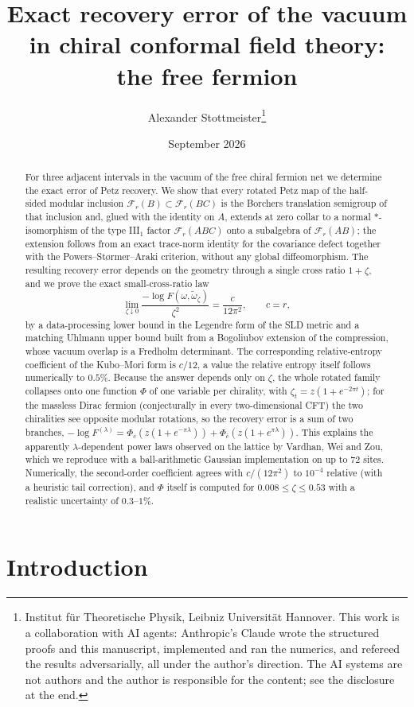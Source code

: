\documentclass[11pt,a4paper]{article}
\title{Exact recovery error of the vacuum in chiral conformal field theory:\\ the free fermion}
\author{Alexander Stottmeister\thanks{Institut f\"ur Theoretische Physik, Leibniz Universit\"at Hannover. This work is a collaboration with AI agents: Anthropic's Claude wrote the structured proofs and this manuscript, implemented and ran the numerics, and refereed the results adversarially, all under the author's direction. The AI systems are not authors and the author is responsible for the content; see the disclosure at the end.}}
\date{September 2026}
\theoremstyle{definition}\newtheorem{definition}[theorem]{Definition}\newtheorem{remark}[theorem]{Remark}
\newcommand{\cF}{\mathcal F}\newcommand{\cM}{\mathcal M}\newcommand{\Fid}{F}\newcommand{\Tr}{\operatorname{Tr}}\newcommand{\eps}{\varepsilon}
\begin{document}
\maketitle
\begin{abstract}
For three adjacent intervals in the vacuum of the free chiral fermion net we
determine the exact error of Petz recovery.  We show that every rotated Petz map
of the half-sided modular inclusion $\cF_r(B)\subset\cF_r(BC)$ is the Borchers
translation semigroup of that inclusion and, glued with the identity on $A$,
extends at zero collar to a normal $*$-isomorphism of the type III$_1$ factor
$\cF_r(ABC)$ onto a subalgebra of $\cF_r(AB)$; the extension follows from an exact
trace-norm identity for the covariance defect together with the
Powers--St\o rmer--Araki criterion, without any global diffeomorphism.  The
resulting recovery error depends on the geometry through a single cross ratio
$1+\zeta$, and we prove the exact small-cross-ratio law
\[
 \lim_{\zeta\downarrow0}\frac{-\log \Fid(\omega,\widetilde\omega_\zeta)}{\zeta^2}
 =\frac{c}{12\pi^2},\qquad c=r,
\]
by a data-processing lower bound in the Legendre form of the SLD metric and a
matching Uhlmann upper bound built from a Bogoliubov extension of the compression,
whose vacuum overlap is a Fredholm determinant.  The corresponding relative-entropy
coefficient of the Kubo--Mori form is $c/12$, a value the relative entropy itself follows numerically to $0.5\%$.  Because the answer depends only on $\zeta$, the whole
rotated family collapses onto one function $\Phi$ of one variable per chirality,
with $\zeta_t=z(1+e^{-2\pi t})$; for the massless Dirac fermion (conjecturally in every two-dimensional CFT) the two chiralities see
opposite modular rotations, so the recovery error is a sum of two branches,
$-\log F^{(\lambda)}=\Phi_c(z(1+e^{-\pi\lambda}))+\Phi_{\bar c}(z(1+e^{\pi\lambda}))$.
This explains the apparently $\lambda$-dependent power laws observed on the lattice
by Vardhan, Wei and Zou, which we reproduce with a ball-arithmetic Gaussian
implementation on up to $72$ sites.  Numerically, the second-order coefficient agrees with $c/(12\pi^2)$ to $10^{-4}$ relative
(with a heuristic tail correction), and $\Phi$ itself is computed for $0.008\le\zeta\le0.53$ with a realistic uncertainty of $0.3$--$1\%$.
\end{abstract}

\section{Introduction}

\end{document}
